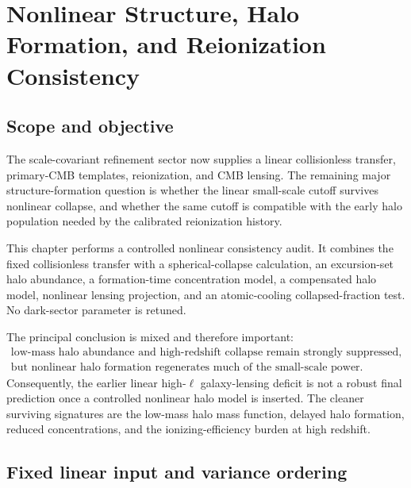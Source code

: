 \chapter[Nonlinear Structure and Reionization]{Nonlinear Structure, Halo Formation, and Reionization Consistency}


\label{ch:nonlinear-structure-halo}

\section{Scope and objective}

The scale-covariant refinement sector now supplies a linear collisionless transfer, primary-CMB templates, reionization, and CMB lensing.  The remaining major structure-formation question is whether the linear small-scale cutoff survives nonlinear collapse, and whether the same cutoff is compatible with the early halo population needed by the calibrated reionization history.

This chapter performs a controlled nonlinear consistency audit.  It combines the fixed collisionless transfer with a spherical-collapse calculation, an excursion-set halo abundance, a formation-time concentration model, a compensated halo model, nonlinear lensing projection, and an atomic-cooling collapsed-fraction test.  No dark-sector parameter is retuned.

The principal conclusion is mixed and therefore important:
\begin{equation}
 \boxed{
 \begin{gathered}
 \text{low-mass halo abundance and high-redshift collapse remain strongly suppressed},\\
 \text{but nonlinear halo formation regenerates much of the small-scale power}. 
 \end{gathered}}
 \label{eq:nlh-central-result}
\end{equation}
Consequently, the earlier linear high-$\ell$ galaxy-lensing deficit is not a robust final prediction once a controlled nonlinear halo model is inserted.  The cleaner surviving signatures are the low-mass halo mass function, delayed halo formation, reduced concentrations, and the ionizing-efficiency burden at high redshift.

\section{Fixed linear input and variance ordering}

